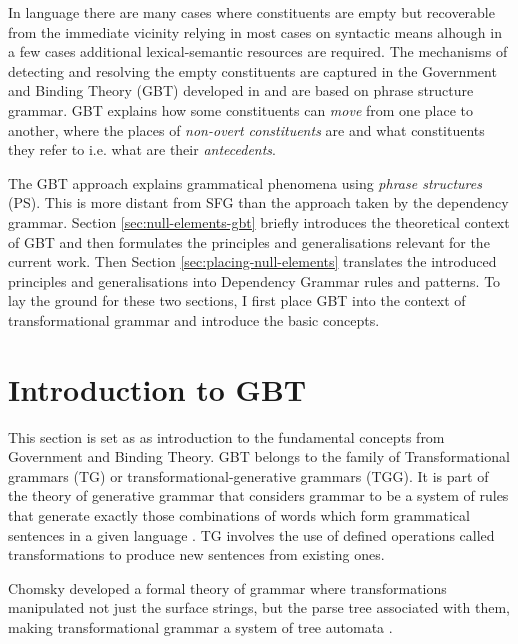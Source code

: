     In language there are many cases where constituents are empty but recoverable from the immediate vicinity relying in most cases on syntactic means alhough in a few cases additional lexical-semantic resources are required. The mechanisms of detecting and resolving the empty constituents are captured in the Government and Binding Theory (GBT) developed in \citet{Chomsky81, Chomsky1982, Chomsky1986} and are based on phrase structure grammar. GBT explains how some constituents can \textit{move} from one place to another, where the places of \textit{non-overt constituents} are and what constituents they refer to i.e. what are their \textit{antecedents}. 

    The GBT approach explains grammatical phenomena using \textit{phrase structures} (PS). This is more distant from SFG than the approach taken by the dependency grammar. Section \ref{sec:null-elements-gbt} briefly introduces the theoretical context of GBT and then formulates the principles and generalisations relevant for the current work. Then Section \ref{sec:placing-null-elements} translates the introduced principles and generalisations into Dependency Grammar rules and patterns. To lay the ground for these two sections, I first place GBT into the context of transformational grammar and introduce the basic concepts.

\section{Introduction to GBT}
\label{sec:phrase-structure}

    This section is set as as introduction to the fundamental concepts from Government and Binding Theory. GBT belongs to the family of Transformational grammars (TG) or transformational-generative grammars (TGG). It is part of the theory of generative grammar that considers grammar to be a system of rules that generate exactly those combinations of words which form grammatical sentences in a given language \mbox{\citep{Chomsky65}}. TG involves the use of defined operations called transformations to produce new sentences from existing ones.

    Chomsky developed a formal theory of grammar \citep{Chomsky56} where transformations manipulated not just the surface strings, but the parse tree associated with them, making transformational grammar a system of tree automata \mbox{\citep{Stockwell1973}}.

